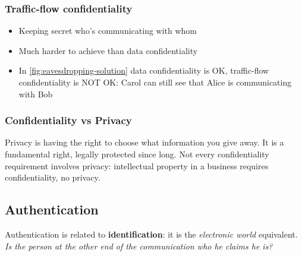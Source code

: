 \documentclass[11pt,british,faculty=ea,layout=titlefont,underline=false,titleUppercase=true,titleUnderline=true,hidelinks]{ugent2016-report}
\begin{document}
			\subsubsection{Traffic-flow confidentiality} \label{subsub:traffic-flow-confidentiality}
				\begin{itemize}
					\item Keeping secret who's communicating with whom
					\item Much harder to achieve than data confidentiality
					\item In \figurename{} \ref{fig:eavesdropping-solution} data confidentiality is OK, traffic-flow confidentiality is NOT OK: Carol can still see that Alice is communicating with Bob
				\end{itemize}

			\subsubsection{Confidentiality vs Privacy} \label{subsub:confidentiality-vs-privacy}
				Privacy is having the right to choose what information you give away.
				It is a fundamental right, legally protected since long.
				Not every confidentiality requirement involves privacy: intellectual property in a business requires confidentiality, no privacy.

		\subsection{Authentication} \label{sub:authentication}
			Authentication is related to \textbf{identification}: it is the \textit{electronic world} equivalent. \textit{Is the person at the other end of the communication who he claims he is?}
\end{document}
